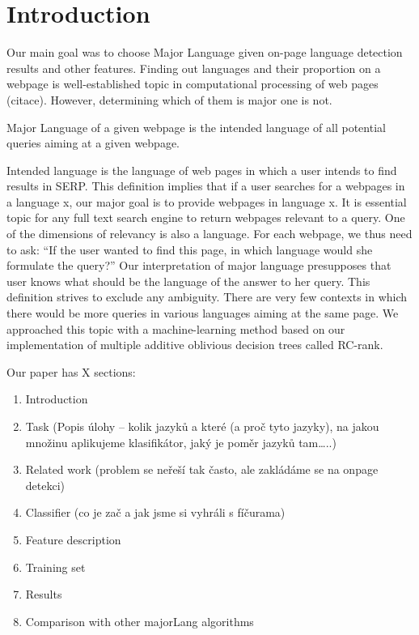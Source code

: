 \documentclass{acm_proc_article-sp}
\begin{document}
\section{Introduction}
  Our main goal was to choose Major Language given on-page language detection results and other features. Finding out languages and their proportion on a webpage is well-established topic in computational processing of web pages (citace). However, determining which of them is major one is not.

  Major Language of a given webpage is the intended language of all potential queries aiming at a given webpage. 

  Intended language is the language of web pages in which a user intends to find results in SERP. This definition implies that if a user searches for a webpages in a language x, our major goal is to provide webpages in language x.
  It is essential topic for any full text search engine to return webpages relevant to a query. One of the dimensions of relevancy is also a language. For each webpage, we thus need to ask: “If the user wanted to find this page, in which language would she formulate the query?” Our interpretation of major language presupposes that user knows what should be the language of the answer to her query.
  This definition strives to exclude any ambiguity. There are very few contexts in which there would be more queries in various languages aiming at the same page.
  We approached this topic with a machine-learning method based on our implementation of multiple additive oblivious decision trees called RC-rank.


  Our paper has X sections:
  \begin{enumerate}
  \item Introduction
  \item Task (Popis úlohy – kolik jazyků a které (a proč tyto jazyky), na jakou množinu aplikujeme klasifikátor, jaký je poměr jazyků tam…..)

  \item Related work (problem se neřeší tak často, ale zakládáme se na onpage detekci)

  \item Classifier  (co je zač a jak jsme si vyhráli s fíčurama)
  \item Feature description
  \item Training set
  \item Results
  \item Comparison with other majorLang algorithms
  \end{enumerate}
  
\end{document}
